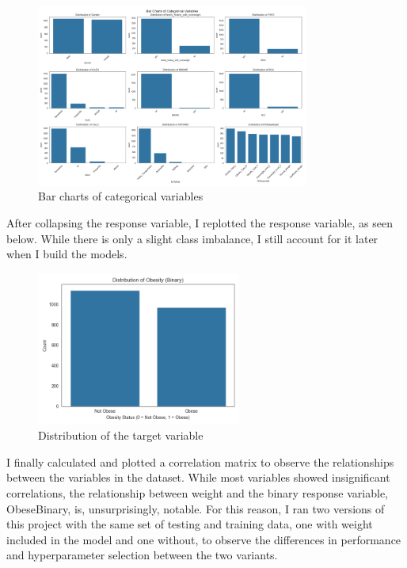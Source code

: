 \documentclass[a4paper,12pt]{article}
\begin{document}
\begin{figure}[H]
    \centering
    \includegraphics[width=0.8\textwidth]{BarCharts.png}
    \caption{Bar charts of categorical variables}
    \label{fig:bar_charts}
\end{figure}

After collapsing the response variable, I replotted the response variable, as seen below. While there is only a slight class imbalance, I still account for it later when I build the models.

\begin{figure}[H]
    \centering
    \includegraphics[width=0.6\textwidth]{ResponseDist.png}
    \caption{Distribution of the target variable}
    \label{fig:obese_binary_dist}
\end{figure}

I finally calculated and plotted a correlation matrix to observe the relationships between the variables in the dataset. While most variables showed insignificant correlations, the relationship between weight and the binary response variable, ObeseBinary, is, unsurprisingly, notable. For this reason, I ran two versions of this project with the same set of testing and training data, one with weight included in the model and one without, to observe the differences in performance and hyperparameter selection between the two variants.
\end{document}
